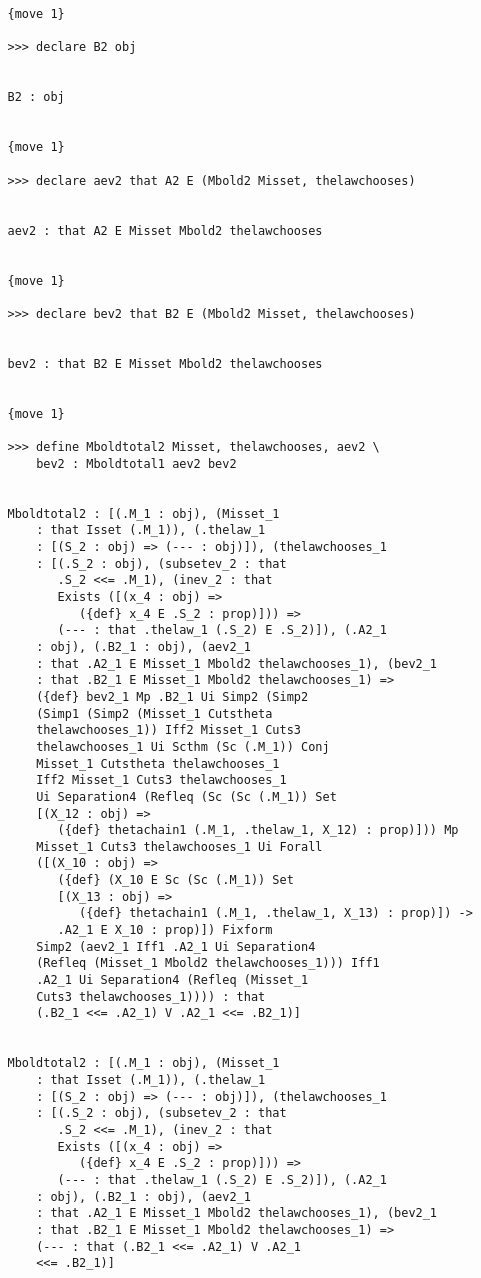 \documentclass[12pt]{article}
\begin{document}
\begin{verbatim}
   {move 1}

   >>> declare B2 obj


   B2 : obj


   {move 1}

   >>> declare aev2 that A2 E (Mbold2 Misset, thelawchooses)


   aev2 : that A2 E Misset Mbold2 thelawchooses


   {move 1}

   >>> declare bev2 that B2 E (Mbold2 Misset, thelawchooses)


   bev2 : that B2 E Misset Mbold2 thelawchooses


   {move 1}

   >>> define Mboldtotal2 Misset, thelawchooses, aev2 \
       bev2 : Mboldtotal1 aev2 bev2


   Mboldtotal2 : [(.M_1 : obj), (Misset_1 
       : that Isset (.M_1)), (.thelaw_1 
       : [(S_2 : obj) => (--- : obj)]), (thelawchooses_1 
       : [(.S_2 : obj), (subsetev_2 : that 
          .S_2 <<= .M_1), (inev_2 : that 
          Exists ([(x_4 : obj) => 
             ({def} x_4 E .S_2 : prop)])) => 
          (--- : that .thelaw_1 (.S_2) E .S_2)]), (.A2_1 
       : obj), (.B2_1 : obj), (aev2_1 
       : that .A2_1 E Misset_1 Mbold2 thelawchooses_1), (bev2_1 
       : that .B2_1 E Misset_1 Mbold2 thelawchooses_1) => 
       ({def} bev2_1 Mp .B2_1 Ui Simp2 (Simp2 
       (Simp1 (Simp2 (Misset_1 Cutstheta 
       thelawchooses_1)) Iff2 Misset_1 Cuts3 
       thelawchooses_1 Ui Scthm (Sc (.M_1)) Conj 
       Misset_1 Cutstheta thelawchooses_1 
       Iff2 Misset_1 Cuts3 thelawchooses_1 
       Ui Separation4 (Refleq (Sc (Sc (.M_1)) Set 
       [(X_12 : obj) => 
          ({def} thetachain1 (.M_1, .thelaw_1, X_12) : prop)])) Mp 
       Misset_1 Cuts3 thelawchooses_1 Ui Forall 
       ([(X_10 : obj) => 
          ({def} (X_10 E Sc (Sc (.M_1)) Set 
          [(X_13 : obj) => 
             ({def} thetachain1 (.M_1, .thelaw_1, X_13) : prop)]) -> 
          .A2_1 E X_10 : prop)]) Fixform 
       Simp2 (aev2_1 Iff1 .A2_1 Ui Separation4 
       (Refleq (Misset_1 Mbold2 thelawchooses_1))) Iff1 
       .A2_1 Ui Separation4 (Refleq (Misset_1 
       Cuts3 thelawchooses_1)))) : that 
       (.B2_1 <<= .A2_1) V .A2_1 <<= .B2_1)]


   Mboldtotal2 : [(.M_1 : obj), (Misset_1 
       : that Isset (.M_1)), (.thelaw_1 
       : [(S_2 : obj) => (--- : obj)]), (thelawchooses_1 
       : [(.S_2 : obj), (subsetev_2 : that 
          .S_2 <<= .M_1), (inev_2 : that 
          Exists ([(x_4 : obj) => 
             ({def} x_4 E .S_2 : prop)])) => 
          (--- : that .thelaw_1 (.S_2) E .S_2)]), (.A2_1 
       : obj), (.B2_1 : obj), (aev2_1 
       : that .A2_1 E Misset_1 Mbold2 thelawchooses_1), (bev2_1 
       : that .B2_1 E Misset_1 Mbold2 thelawchooses_1) => 
       (--- : that (.B2_1 <<= .A2_1) V .A2_1 
       <<= .B2_1)]



\end{verbatim}
\end{document}

